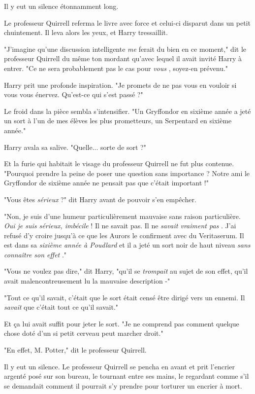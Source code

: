 Il y eut un silence étonnamment long.

Le professeur Quirrell referma le livre avec force et celui-ci disparut dans un petit chuintement. Il leva alors les yeux, et Harry tressaillit.

"J'imagine qu'une discussion intelligente \emph{me}  ferait du bien en ce moment," dit le professeur Quirrell du même ton mordant qu'avec lequel il avait invité Harry à entrer. "Ce ne sera probablement pas le cas pour \emph{vous} , soyez-en prévenu."

Harry prit une profonde inspiration. "Je promets de ne pas vous en vouloir si vous vous énervez. Qu'est-ce qui s'est passé ?"

Le froid dans la pièce sembla s'intensifier. "Un Gryffondor en sixième année a jeté un sort à l'un de mes élèves les plus prometteurs, un Serpentard en sixième année."

Harry avala sa salive. "Quelle... sorte de sort ?"

Et la furie qui habitait le visage du professeur Quirrell ne fut plus contenue. "Pourquoi prendre la peine de poser une question sans importance ? Notre ami le Gryffondor de sixième année ne pensait pas que c'était important !"

"Vous êtes \emph{sérieux}  ?" dit Harry avant de pouvoir s'en empêcher.

"Non, je suis d'une humeur particulièrement mauvaise sans raison particulière. \emph{Oui je suis sérieux, imbécile}  ! Il ne savait pas. Il ne \emph{savait vraiment pas} . J'ai refusé d'y croire jusqu'à ce que les Aurors le confirment avec du Veritaserum. Il est dans sa \emph{sixième année à Poudlard}  et il a jeté un sort noir de haut niveau \emph{sans connaître son effet} ."

"Vous ne voulez pas dire," dit Harry, "qu'il se \emph{trompait}  au sujet de son effet, qu'il avait malencontreusement lu la mauvaise description -"

"Tout ce qu'il savait, c'était que le sort était censé être dirigé vers un ennemi. Il \emph{savait}  que c'était tout ce qu'il savait."

Et ça lui avait suffit pour jeter le sort. "Je ne comprend pas comment quelque chose doté d'un si petit cerveau peut marcher droit."

"En effet, M. Potter," dit le professeur Quirrell.

Il y eut un silence. Le professeur Quirrell se pencha en avant et prit l'encrier argenté posé sur son bureau, le tournant entre ses mains, le regardant comme s'il se demandait comment il pourrait s'y prendre pour torturer un encrier à mort.

